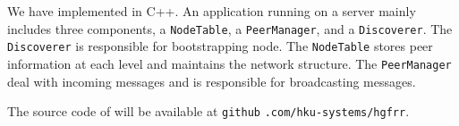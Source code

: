 We have implemented \xxx in C++. An \xxx application running on a server mainly includes three components, a \texttt{NodeTable}, a \texttt{PeerManager}, and a \texttt{Discoverer}. The \texttt{Discoverer} is responsible for bootstrapping node. The \texttt{NodeTable} stores peer information at each level and maintains the network structure. The \texttt{PeerManager} deal with incoming messages and is responsible for broadcasting messages.

The source code of \xxx will be available at \texttt{github} \texttt{.com/hku-systems/hgfrr}.